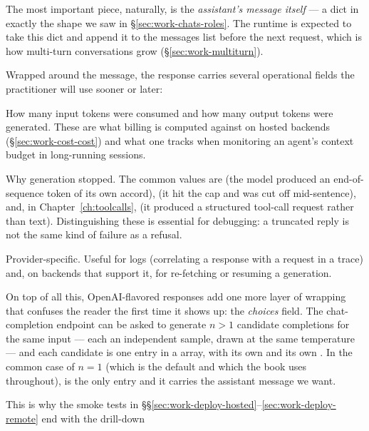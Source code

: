 The most important piece, naturally, is the \emph{assistant's
message itself} --- a  dict in exactly the shape we saw in
\S\ref{sec:work-chats-roles}. The runtime is expected to take this
dict and append it to the messages list before the next request,
which is how multi-turn conversations grow
(\S\ref{sec:work-multiturn}).

Wrapped around the message, the response carries several
operational fields the practitioner will use sooner or later:

\begin{description}[style=nextline,leftmargin=1.5em,itemsep=0.3em]
\item[Token counts.] How many input tokens were consumed and how
  many output tokens were generated. These are what billing is
  computed against on hosted backends (\S\ref{sec:work-cost-cost})
  and what one tracks when monitoring an agent's context budget
  in long-running sessions.
\item[A finish reason.] Why generation stopped. The common values
  are  (the model produced an end-of-sequence token of
  its own accord),  (it hit the 
  cap and was cut off mid-sentence), and, in
  Chapter~\ref{ch:toolcalls},  (it produced a
  structured tool-call request rather than text). Distinguishing
  these is essential for debugging: a truncated reply is not the
  same kind of failure as a refusal.
\item[A response identifier and timing block.] Provider-specific.
  Useful for logs (correlating a response with a request in a
  trace) and, on backends that support it, for re-fetching or
  resuming a generation.
\end{description}

\noindent
On top of all this, OpenAI-flavored responses add one more layer
of wrapping that confuses the reader the first time it shows up:
the \emph{choices} field. The chat-completion endpoint can be
asked to generate $n > 1$ candidate completions for the same
input --- each an independent sample, drawn at the same
temperature --- and each candidate is one entry in a
 array, with its own  and its own
. In the common case of $n = 1$ (which is
the default and which the book uses throughout),
 is the only entry and it carries the assistant
message we want.

This is why the smoke tests in
\S\S\ref{sec:work-deploy-hosted}--\ref{sec:work-deploy-remote}
end with the drill-down

